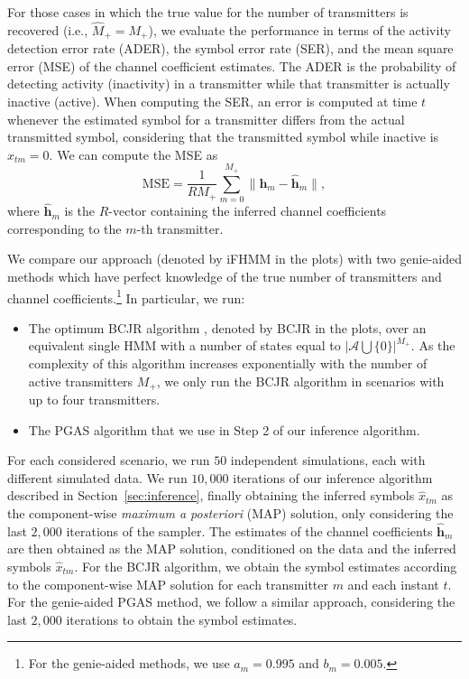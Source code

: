 \documentclass[a4paper]{article}
\def\hm{\mathbf{h}_m}
\def\hathm{\hat{\mathbf{h}}_m}
\def\xtm{x_{tm}}
\def\Acal{\mathcal{A}}
\begin{document}

For those cases in which the true value for the number of transmitters is recovered (i.e.,  $\hat{M}_+ =M_+$), we evaluate the performance in terms of the activity detection error rate (ADER), the symbol error rate (SER), and the mean square error (MSE) of the channel coefficient estimates. The ADER is the probability of detecting activity (inactivity) in a transmitter while that transmitter is actually inactive (active). When computing the SER, an error is computed at time $t$ whenever the estimated symbol for a transmitter differs from the actual transmitted symbol, considering that the transmitted symbol while inactive is $\xtm=0$. We can compute the MSE as
\begin{equation}
\mathrm{MSE} = \frac{1}{R M_+}  \sum_{m=0}^{M_+} \|\hm- \hathm\|,
\end{equation} 
where $\hathm$ is the $R$-vector containing the inferred channel coefficients corresponding to the $m$-th transmitter.

We compare our approach (denoted by iFHMM in the plots) with two genie-aided methods which have perfect knowledge of the true number of transmitters and channel coefficients.\footnote{For the genie-aided methods, we use $a_m=0.995$ and $b_m=0.005$.} In particular, we run:
\begin{itemize}
\item The optimum BCJR algorithm \cite{Bahl74}, denoted by BCJR in the plots, over an equivalent single HMM with a number of states equal to $| \Acal \bigcup \{0\} |^{M_+}$. As the complexity of this algorithm increases exponentially with the number of active transmitters $M_+$, we only run the BCJR algorithm in scenarios with up to four transmitters.
\item The PGAS algorithm that we use in Step 2 of our inference algorithm.
\end{itemize}

For each considered scenario, we run $50$ independent simulations, each with different simulated data. We run $10,000$ iterations of our inference algorithm described in Section~\ref{sec:inference}, finally obtaining the inferred symbols $\hat{x}_{tm}$ as the component-wise \textit{maximum a posteriori} (MAP) solution, only considering the last $2,000$ iterations of the sampler. The estimates of the channel coefficients $\hathm$ are then obtained as the MAP solution, conditioned on the data and the inferred symbols $\hat{x}_{tm}$. For the BCJR algorithm, we obtain the symbol estimates according to the component-wise MAP solution for each transmitter $m$ and each instant $t$. For the genie-aided PGAS method, we follow a similar approach, considering the last $2,000$ iterations to obtain the symbol estimates.
\end{document}
